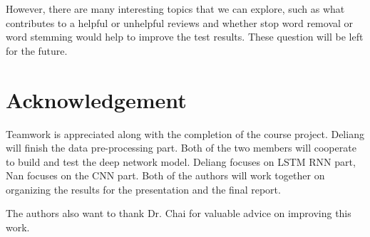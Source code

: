 \documentclass[11pt]{article}
\begin{document}
However, there are many interesting topics that we can explore, such as what contributes to a helpful or unhelpful reviews and whether stop word removal or word stemming would help to improve the test results. These question will be left for the future. 

\section{Acknowledgement}

Teamwork is appreciated along with the completion of the course project. Deliang will finish the data pre-processing part. Both of the two members will cooperate to build and test the deep network model. Deliang focuses on LSTM RNN part, Nan focuses on the CNN part. Both of the authors will work together on organizing the results for the presentation and the final report. 

The authors also want to thank Dr. Chai for valuable advice on improving this work.



\end{document}
